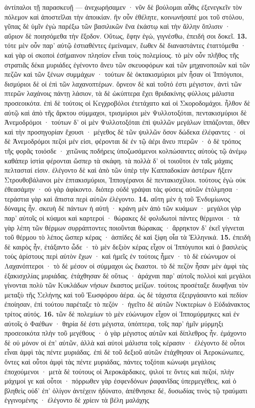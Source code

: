 \documentclass[a4paper, 11pt, oneside, polutonikogreek, german]{article}
\begin{document}
ἀντίπαλοι τῇ παρασκευῇ --- ἀνεχωρήσαμεν · νῦν δὲ βούλομαι αὖθις ἐξενεγκεῖν τὸν πόλεμον καὶ ἀποστεῖλαι τὴν ἀποικίαν. ἢν οὖν ἐθέλητε, κοινωνήσατέ μοι τοῦ στόλου, γῦπας δὲ ὑμῖν ἐγὼ παρέξω τῶν βασιλικῶν ἕνα ἑκάστῳ καὶ τὴν ἄλλην ὅπλισιν · αὔριον δὲ ποιησόμεθα τὴν ἔξοδον. Οὕτως, ἔφην ἐγώ, γιγνέσθω, ἐπειδή σοι δοκεῖ. \textbf{13.} τότε μὲν οὖν παρ' αὐτῷ ἑστιαθέντες ἐμείναμεν, ἕωθεν δὲ διαναστάντες ἐταττόμεθα · καὶ γὰρ οἱ σκοποὶ ἐσήμαινον πλησίον εἶναι τοὺς πολεμίους. τὸ μὲν οὖν πλῆθος τῆς στρατιᾶς δέκα μυριάδες ἐγένοντο ἄνευ τῶν σκευοφόρων καὶ τῶν μηχανοποιῶν καὶ τῶν πεζῶν καὶ τῶν ξένων συμμάχων · τούτων δὲ ὀκτακισμύριοι μὲν ἦσαν οἱ Ἱππόγυποι, δισμύριοι δὲ οἱ ἐπὶ τῶν λαχανοπτέρων. ὄρνεον δὲ καὶ τοῦτό ἐστι μέγιστον, ἀντὶ τῶν πτερῶν λαχάνοις πάντῃ λάσιον, τὰ δὲ ὠκύπτερα ἔχει θριδακίνης φύλλοις μάλιστα προσεοικότα. ἐπὶ δὲ τούτοις οἱ Κεγχροβόλοι ἐτετάχατο καὶ οἱ Σκοροδομάχοι. ἦλθον δὲ αὐτῷ καὶ ἀπὸ τῆς ἄρκτου σύμμαχοι, τρισμύριοι μὲν Ψυλλοτοξόται, πεντακισμύριοι δὲ Ἀνεμοδρόμοι · τούτων δ' οἱ μὲν Ψυλλοτοξόται ἐπὶ ψυλλῶν μεγάλων ἱππάζονται, ὅθεν καὶ τὴν προσηγορίαν ἔχουσι · μέγεθος δὲ τῶν ψυλλῶν ὅσον δώδεκα ἐλέφαντες · οἱ δὲ Ἀνεμοδρόμοι πεζοὶ μέν εἰσι, φέρονται δὲ ἐν τῷ ἀέρι ἄνευ πτερῶν · ὁ δὲ τρόπος τῆς φορᾶς τοιόσδε · χιτῶνας ποδήρεις ὑποζωσάμενοι κολπώσαντες αὐτοὺς τῷ ἀνέμῳ καθάπερ ἱστία φέρονται ὥσπερ τὰ σκάφη. τὰ πολλὰ δ' οἱ τοιοῦτοι ἐν ταῖς μάχαις πελτασταί εἰσιν. ἐλέγοντο δὲ καὶ ἀπὸ τῶν ὑπὲρ τὴν Καππαδοκίαν ἀστέρων ἥξειν Στρουθοβάλανοι μὲν ἑπτακισμύριοι, Ἱππογέρανοι δὲ πεντακισχίλιοι. τούτους ἐγὼ οὐκ ἐθεασάμην · οὐ γὰρ ἀφίκοντο. διόπερ οὐδὲ γράψαι τὰς φύσεις αὐτῶν ἐτόλμησα · τεράστια γὰρ καὶ ἄπιστα περὶ αὐτῶν ἐλέγοντο. \textbf{14.} αὕτη μὲν ἡ τοῦ Ἐνδυμίωνος δύναμις ἦν. σκευὴ δὲ πάντων ἡ αὐτή · κράνη μὲν ἀπὸ τῶν κυάμων · μεγάλοι γὰρ παρ' αὐτοῖς οἱ κύαμοι καὶ καρτεροί · θώρακες δὲ φολιδωτοὶ πάντες θέρμινοι · τὰ γὰρ λέπη τῶν θέρμων συρράπτοντες ποιοῦνται θώρακας · ἄρρηκτον δ' ἐκεῖ γίγνεται τοῦ θέρμου τὸ λέπος ὥσπερ κέρας · ἀσπίδες δὲ καὶ ξίφη οἷα τὰ Ἑλληνικά. \textbf{15.} ἐπειδὴ δὲ καιρὸς ἦν, ἐτάξαντο ὧδε · τὸ μὲν δεξιὸν κέρας εἶχον οἱ Ἱππόγυποι καὶ ὁ βασιλεὺς τοὺς ἀρίστους περὶ αὑτὸν ἔχων · καὶ ἡμεῖς ἐν τούτοις ἦμεν · τὸ δὲ εὐώνυμον οἱ Λαχανόπτεροι · τὸ δὲ μέσον οἱ σύμμαχοι ὡς ἕκαστοι. τὸ δὲ πεζὸν ἦσαν μὲν ἀμφὶ τὰς ἑξακισχιλίας μυριάδας. ἐτάχθησαν δὲ οὕτως · ἀράχναι παρ' αὐτοῖς πολλοὶ καὶ μεγάλοι γίνονται πολὺ τῶν Κυκλάδων νήσων ἕκαστος μείζων. τούτοις προσέταξε διυφῆναι τὸν μεταξὺ τῆς Σελήνης καὶ τοῦ Ἑωσφόρου ἀέρα. ὡς δὲ τάχιστα ἐξειργάσαντο καὶ πεδίον ἐποίησαν, ἐπὶ τούτου παρέταξε τὸ πεζόν · ἡγεῖτο δὲ αὐτῶν Νυκτερίων ὁ Εὐδιάνακτος τρίτος αὐτός. \textbf{16.} τῶν δὲ πολεμίων τὸ μὲν εὐώνυμον εἶχον οἱ Ἱππομύρμηκες καὶ ἐν αὐτοῖς ὁ Φαέθων · θηρία δέ ἐστι μέγιστα, ὑπόπτερα, τοῖς παρ' ἡμῖν μύρμηξι προσεοικότα πλὴν τοῦ μεγέθους · ὁ γὰρ μέγιστος αὐτῶν καὶ δίπλεθρος ἦν. ἐμάχοντο δὲ οὐ μόνον οἱ ἐπ' αὐτῶν, ἀλλὰ καὶ αὐτοὶ μάλιστα τοῖς κέρασιν · ἐλέγοντο δὲ οὗτοι εἶναι ἀμφὶ τὰς πέντε μυριάδας. ἐπὶ δὲ τοῦ δεξιοῦ αὐτῶν ἐτάχθησαν οἱ Ἀεροκώνωπες, ὄντες καὶ οὗτοι ἀμφὶ τὰς πέντε μυριάδας, πάντες τοξόται κώνωψι μεγάλοις ἐποχούμενοι · μετὰ δὲ τούτους οἱ Ἀεροκάρδακες, ψιλοί τε ὄντες καὶ πεζοί, πλὴν μάχιμοί γε καὶ οὗτοι · πόρρωθεν γὰρ ἐσφενδόνων ῥαφανῖδας ὑπερμεγέθεις, καὶ ὁ βληθεὶς οὐδ' ἐπ' ὀλίγον ἀντέχειν ἠδύνατο, ἀπέθνησκε δέ, δυσωδίας τινὸς τῷ τραύματι ἐγγινομένης · ἐλέγοντο δὲ χρίειν τὰ βέλη μαλάχης 
\end{document}
